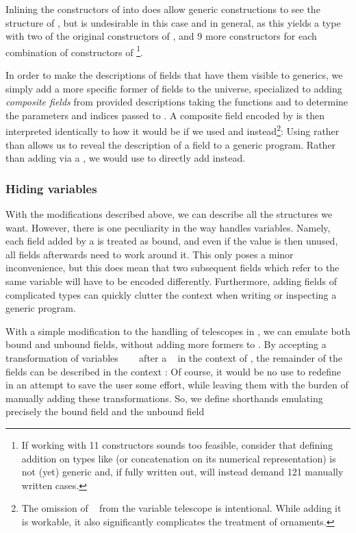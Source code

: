 Inlining the constructors of  into  does allow generic constructions to see the structure of , but is undesirable in this case and in general, as this yields a type with two of the original constructors of , and 9 more constructors for each combination of constructors of \footnote{If working with 11 constructors sounds too feasible, consider that defining addition on types like  (or concatenation on its numerical representation) is not (yet) generic and, if fully written out, will instead demand 121 manually written cases.}.

In order to make the descriptions of fields that have them visible to generics, we simply add a more specific former of fields to the universe, specialized to adding \emph{composite fields} from provided descriptions
taking the functions  and  to determine the parameters and indices passed to . A composite field encoded by  is then interpreted identically to how it would be if we used  and  instead\footnote{The omission of \  from the variable telescope is intentional. While adding it is workable, it also significantly complicates the treatment of ornaments.}:
Using  rather than  allows us to reveal the description of a field to a generic program. Rather than adding  via a , we would use  to directly add  instead.

\subsubsection{Hiding variables}
With the modifications described above, we can describe all the structures we want. However, there is one peculiarity in the way  handles variables. Namely, each field added by a  is treated as bound, and even if the value is then unused, all fields afterwards need to work around it. This only poses a minor inconvenience, but this does mean that two subsequent fields which refer to the same variable will have to be encoded differently. Furthermore, adding fields of complicated types can quickly clutter the context when writing or inspecting a generic program.

With a simple modification to the handling of telescopes in , we can emulate both bound and unbound fields, without adding more formers to . By accepting a transformation of variables \ \ \  after a \  in the context of , the remainder of the fields can be described in the context :
Of course, it would be no use to redefine  in an attempt to save the user some effort, while leaving them with the burden of manually adding these transformations. So, we define shorthands emulating precisely the bound field
and the unbound field


